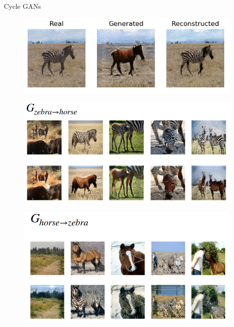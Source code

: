 \begin{frame}[allowframebreaks]{Cycle GANs}
\framebreak
\begin{figure}
    \centering
    \includegraphics[height=0.7\textheight, width=\textwidth, keepaspectratio]{images/gan/cycle_gan_3.png}
\end{figure}

\framebreak
\begin{figure}
    \centering
    \includegraphics[height=0.9\textheight, width=\textwidth, keepaspectratio]{images/gan/cycle_gan_4.png}
\end{figure}

\framebreak
\begin{figure}
    \centering
    \includegraphics[height=0.9\textheight, width=\textwidth, keepaspectratio]{images/gan/cycle_gan_5.png}
\end{figure}


\end{frame}
